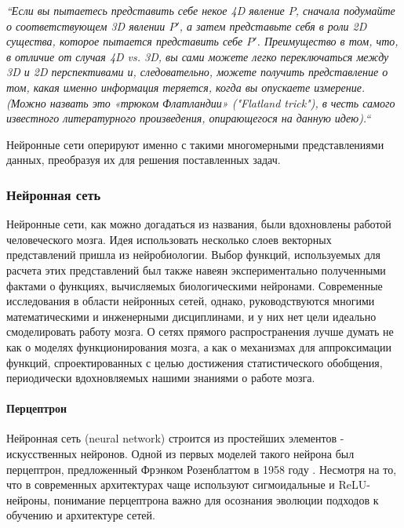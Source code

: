 \begin{quoting}
    \itshape
    “Если вы пытаетесь представить себе некое 4D явление $P$, 
    сначала подумайте о соответствующем 3D явлении $P'$, 
    а затем представьте себя в роли 2D существа, которое 
    пытается представить себе $P'$. Преимущество в том, что, в отличие 
    от случая 4D vs. 3D, вы сами можете легко переключаться между 3D 
    и 2D перспективами и, следовательно, можете получить представление 
    о том, какая именно информация теряется, когда вы опускаете измерение. 
    (Можно назвать это «трюком Флатландии» ("Flatland trick"), в честь самого 
    известного литературного произведения, опирающегося на данную идею).“
\end{quoting}

Нейронные сети оперируют именно с такими многомерными представлениями данных, 
преобразуя их для решения поставленных задач.

\subsubsection{Нейронная сеть}

Нейронные сети, как можно догадаться из названия, были вдохновлены работой человеческого 
мозга. Идея использовать несколько слоев векторных представлений пришла из нейробиологии. 
Выбор функций, используемых для расчета этих представлений был также навеян 
экспериментально полученными фактами о функциях, вычисляемых биологическими нейронами. 
Современные исследования в области нейронных сетей, однако, руководствуются 
многими математическими и инженерными дисциплинами, и у них нет цели идеально 
смоделировать работу мозга. О сетях прямого распространения лучше думать 
не как о моделях функционирования мозга, а как о 
механизмах для аппроксимации функций, спроектированных с целью достижения 
статистического обобщения, периодически вдохновляемых нашими знаниями о работе 
мозга.

\paragraph{Перцептрон}

Нейронная сеть (neural network) строится из простейших элементов - искусственных 
нейронов. Одной из первых моделей такого нейрона был перцептрон, 
предложенный Фрэнком Розенблаттом в 1958 году \cite{Rosenblatt_perceptron}. Несмотря на то, что в 
современных архитектурах чаще используют сигмоидальные и ReLU-нейроны, 
понимание перцептрона важно для осознания эволюции подходов к обучению 
и архитектуре сетей.

